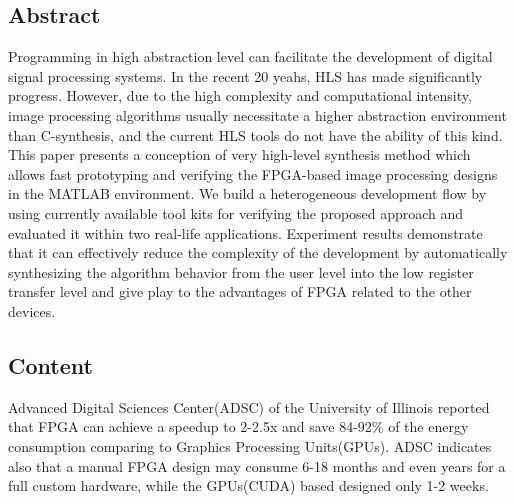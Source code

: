 \subsection{Abstract}
Programming in high abstraction level can facilitate the development of digital signal processing systems. In the recent 20 yeahs, HLS has made significantly progress. However, due to the high complexity and computational intensity, image processing algorithms usually necessitate a higher abstraction environment than C-synthesis, and the current HLS tools do not have the ability of this kind. This paper presents a conception of very high-level synthesis method which allows fast prototyping and verifying the FPGA-based image processing designs in the MATLAB environment. We build a heterogeneous development flow by using currently available tool kits for verifying the proposed approach and evaluated it within two real-life applications. Experiment results demonstrate that it can effectively reduce the complexity of the development by automatically synthesizing the algorithm behavior from the user level into the low register transfer level and give play to the advantages of FPGA related to the other devices.
\subsection{Content}
Advanced Digital Sciences Center(ADSC) of the University of Illinois reported that FPGA can achieve a speedup to 2-2.5x and save 84-92\% of the energy consumption comparing to Graphics Processing Units(GPUs). ADSC indicates also that a manual FPGA design may consume 6-18 months and even years for a full custom hardware, while the GPUs(CUDA) based designed only 1-2 weeks. \\

